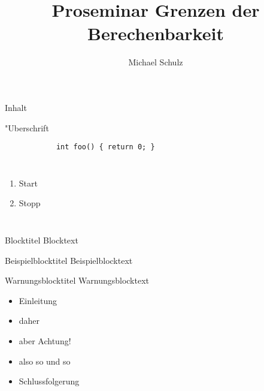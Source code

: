 \documentclass{beamer}
\title{Proseminar Grenzen der Berechenbarkeit}
\author[M. Schulz]{
	Michael Schulz
}
\begin{document}
	\frame{
		\titlepage
	}

	\begin{frame}
		Inhalt
	\end{frame}
	
	\begin{frame}[fragile]{"Uberschrift}
		\begin{verbatim}
			int foo() { return 0; }
		\end{verbatim}
	\end{frame}


	
	\begin{columns}
	                \begin{enumerate}
	                \item Start
	                \item Stopp
	                \end{enumerate}
	                
	        
	\end{columns}
	
	\begin{frame}
		\begin{block}{Blocktitel}
		        Blocktext
		\end{block}
		
		\begin{exampleblock}{Beispielblocktitel}
		        Beispielblocktext
		\end{exampleblock}
		
		\begin{alertblock}{Warnungsblocktitel}
			                Warnungsblocktext
		\end{alertblock}
	\end{frame}
	
	\begin{frame}
		\begin{itemize}
		        \item Einleitung
		        \item<2-> daher
		        \item<alert@3> aber Achtung!
		        \item<3-> also so und so
		        \item<4-> Schlussfolgerung
		\end{itemize}
	\end{frame}
	
\end{document}
